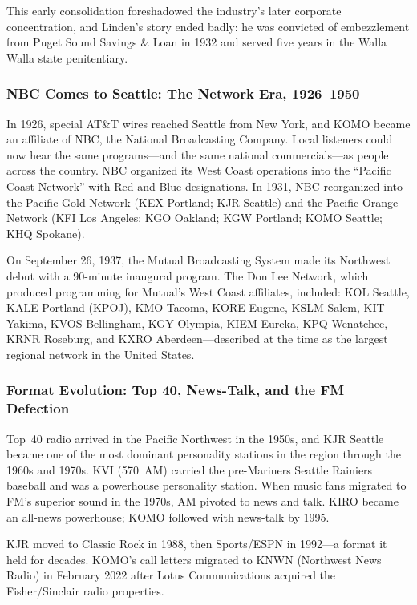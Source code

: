 \documentclass[11pt,letterpaper]{article}
\begin{document}
\begin{asciibox}
This early consolidation foreshadowed the industry's later corporate concentration, and Linden's
story ended badly: he was convicted of embezzlement from Puget Sound Savings \& Loan in 1932
and served five years in the Walla Walla state penitentiary.

\subsubsection{NBC Comes to Seattle: The Network Era, 1926--1950}

In 1926, special AT\&T wires reached Seattle from New York, and KOMO became an affiliate of NBC,
the National Broadcasting Company. Local listeners could now hear the same programs---and the
same national commercials---as people across the country. NBC organized its West Coast operations
into the ``Pacific Coast Network'' with Red and Blue designations. In 1931, NBC reorganized into
the Pacific Gold Network (KEX Portland; KJR Seattle) and the Pacific Orange Network (KFI Los
Angeles; KGO Oakland; KGW Portland; KOMO Seattle; KHQ Spokane).

On September 26, 1937, the Mutual Broadcasting System made its Northwest debut with a 90-minute
inaugural program. The Don Lee Network, which produced programming for Mutual's West Coast
affiliates, included: KOL Seattle, KALE Portland (KPOJ), KMO Tacoma, KORE Eugene, KSLM Salem,
KIT Yakima, KVOS Bellingham, KGY Olympia, KIEM Eureka, KPQ Wenatchee, KRNR Roseburg, and KXRO
Aberdeen---described at the time as the largest regional network in the United States.

\subsubsection{Format Evolution: Top 40, News-Talk, and the FM Defection}

Top~40 radio arrived in the Pacific Northwest in the 1950s, and KJR Seattle became one of the
most dominant personality stations in the region through the 1960s and 1970s. KVI (570~AM)
carried the pre-Mariners Seattle Rainiers baseball and was a powerhouse personality station.
When music fans migrated to FM's superior sound in the 1970s, AM pivoted to news and talk.
KIRO became an all-news powerhouse; KOMO followed with news-talk by 1995.

KJR moved to Classic Rock in 1988, then Sports/ESPN in 1992---a format it held for decades.
KOMO's call letters migrated to KNWN (Northwest News Radio) in February 2022 after Lotus
Communications acquired the Fisher/Sinclair radio properties.


\end{asciibox}
\end{document}
